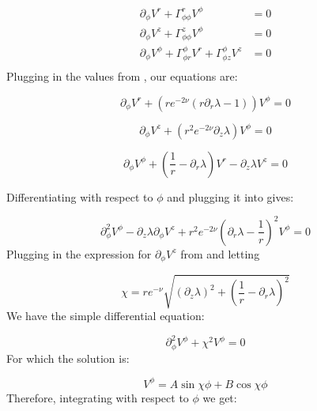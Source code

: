 \documentclass[12pt]{article}
\begin{document}
\begin{appendices}
\begin{equation}
\begin{aligned}
\partial_{\phi}V^{r}+\Gamma^{r}_{\phi\phi}V^{\phi}&=0\\
\partial_{\phi}V^{z}+\Gamma^{z}_{\phi\phi}V^{\phi}&=0\\
\partial_{\phi}V^{\phi}+\Gamma^{\phi}_{\phi r}V^{r}+\Gamma^{\phi}_{\phi z}V^{z}&=0\\
\end{aligned}
\end{equation}
Plugging in the values from , our equations are:

\begin{equation}
\partial_{\phi}V^{r}+\left(re^{-2\nu}\left(r\partial_{r}\lambda-1\right)\right)V^{\phi}=0\label{eq:V-r-phi}
\end{equation}

\begin{equation}
\label{eq:V_z-V_phi}
\partial_{\phi}V^{z}+\left(r^{2}e^{-2\nu}\partial_{z}\lambda\right)V^{\phi}=0
\end{equation}

\begin{equation}
\partial_{\phi}V^{\phi}+\left(\frac{1}{r}-\partial_{r}\lambda\right)V^{r}-\partial_{z}\lambda V^{z}=0\label{eq:V-phi-r-z}
\end{equation}

Differentiating  with respect to $\phi$ and plugging it into  gives:

\begin{equation}
\partial^{2}_{\phi}V^{\phi}-\partial_z\lambda\partial_{\phi}V^z+r^{2}e^{-2\nu}\left(\partial_r\lambda-\frac{1}{r}\right)^2V^{\phi}=0
\end{equation}
Plugging in the expression for $\partial_{\phi}V^z$ from
 and letting

\begin{equation}
\label{eq:def-chi}
\chi=re^{-\nu}\sqrt{\left(\partial_z\lambda\right)^2+\left(\frac{1}{r}-\partial_r\lambda\right)^2}
\end{equation}
We have the simple differential equation:

\begin{equation}
\partial^2_\phi V^\phi+\chi^2 V^\phi=0
\end{equation}
For which the solution is:

\begin{equation}
V^{\phi}=A\sin\chi\phi+B\cos\chi\phi
\end{equation}
Therefore, integrating  with respect to $\phi$ we get:


\end{appendices}
\end{document}
